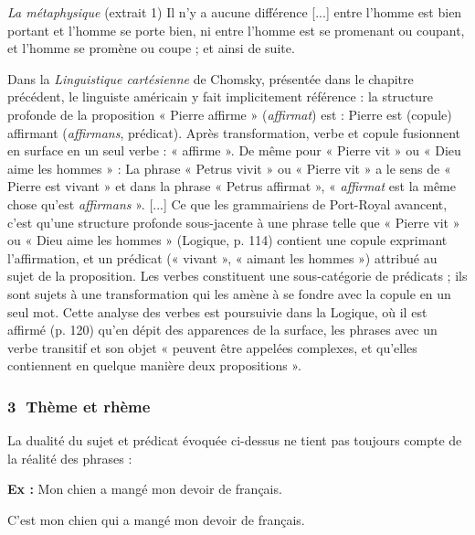 \begin{lecture}{\textit{La métaphysique} (extrait 1)}
Il n’y a aucune différence [...] entre l’homme est bien portant et l’homme se porte bien, ni entre l’homme est se promenant ou coupant, et l’homme se promène ou coupe ; et ainsi de suite.
\end{lecture}

\begin{bbcomplement}{}
Dans la \textit{Linguistique cartésienne} de Chomsky, présentée dans le chapitre précédent, le linguiste américain y fait implicitement référence : la structure profonde de la proposition « Pierre affirme » (\textit{affirmat}) est : Pierre est (copule) affirmant (\textit{affirmans}, prédicat). Après transformation, verbe et copule fusionnent en surface en un seul verbe : « affirme ». De même pour « Pierre vit » ou « Dieu aime les hommes » :
La phrase « Petrus vivit » ou « Pierre vit » a le sens de « Pierre est vivant » et dans la phrase « Petrus affirmat », « \textit{affirmat} est la même chose qu’est \textit{affirmans} ». [...] Ce que les grammairiens de Port-Royal avancent, c’est qu’une structure profonde sous-jacente à une phrase telle que « Pierre vit » ou « Dieu aime les hommes » (Logique, p. 114) contient une copule exprimant l’affirmation, et un prédicat (« vivant », « aimant les hommes ») attribué au sujet de la proposition. Les verbes constituent une sous-catégorie de prédicats ; ils sont sujets à une transformation qui les amène à se fondre avec la copule en un seul mot. Cette analyse des verbes est poursuivie dans la Logique, où il est affirmé (p. 120) qu’en dépit des apparences de la surface, les phrases avec un verbe transitif et son objet « peuvent être appelées complexes, et qu’elles contiennent en quelque manière deux propositions ».
\end{bbcomplement}

\subsubsection*{\textcircled{\scriptsize 3} Thème et rhème}
La dualité du sujet et prédicat évoquée ci-dessus ne tient pas toujours compte de la réalité des phrases :

\noindent\textbf{Ex :} Mon chien a mangé mon devoir de français.

\hspace*{1.5em}C’est mon chien qui a mangé mon devoir de français.

